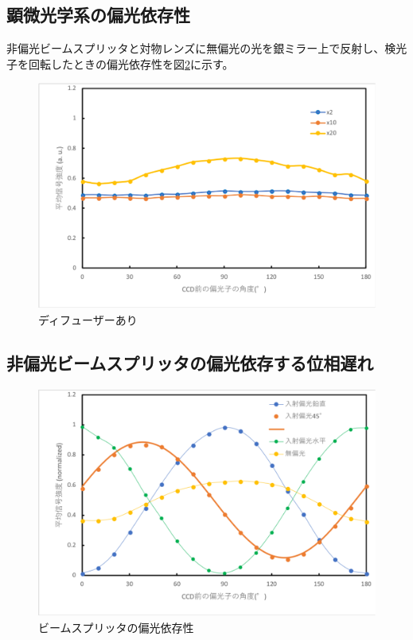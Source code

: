 \documentclass[11pt,a4paper]{jsarticle}
\begin{document}
\subsection{顕微光学系の偏光依存性}
非偏光ビームスプリッタと対物レンズに無偏光の光を銀ミラー上で反射し、検光子を回転したときの偏光依存性を図\ref{fig:objective}に示す。
\begin{figure}[htbp]
  \begin{center}
   \includegraphics[width=120mm]{objective.eps}
  \end{center}
  \caption{ディフューザーあり}
  \label{fig:objective}
\end{figure}

\subsection{非偏光ビームスプリッタの偏光依存する位相遅れ}
\begin{figure}[htbp]
  \begin{center}
   \includegraphics[width=120mm]{nonpol_BS.eps}
  \end{center}
  \caption{ビームスプリッタの偏光依存性}
  \label{fig:objective}
\end{figure}
\end{document}
